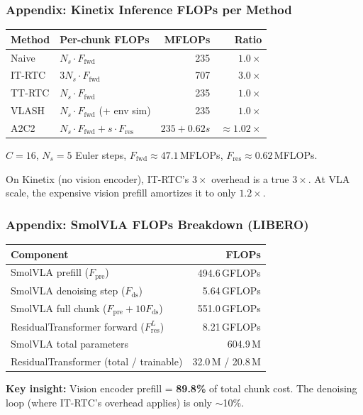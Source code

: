 \documentclass[aspectratio=1610]{beamer}
\begin{document}
\begin{frame}
\frametitle{Appendix: Kinetix Inference FLOPs per Method}

\begin{table}
\centering
\small
\begin{tabular}{l l r r}
\toprule
\textbf{Method} & \textbf{Per-chunk FLOPs} & \textbf{MFLOPs} & \textbf{Ratio} \\
\midrule
Naive     & $N_s \cdot F_{\text{fwd}}$ & 235 & $1.0\times$ \\
IT-RTC    & $3 N_s \cdot F_{\text{fwd}}$ & 707 & $3.0\times$ \\
TT-RTC    & $N_s \cdot F_{\text{fwd}}$ & 235 & $1.0\times$ \\
VLASH     & $N_s \cdot F_{\text{fwd}}$ (+ env sim) & 235 & $1.0\times$ \\
A2C2      & $N_s \cdot F_{\text{fwd}} + s \cdot F_{\text{res}}$ & $235 + 0.62s$ & $\approx 1.02\times$ \\
\bottomrule
\end{tabular}
\end{table}

\small $C{=}16$, $N_s{=}5$ Euler steps, $F_{\text{fwd}} \approx 47.1$\,MFLOPs, $F_{\text{res}} \approx 0.62$\,MFLOPs.

On Kinetix (no vision encoder), IT-RTC's $3\times$ overhead is a true $3\times$. At VLA scale, the expensive vision prefill amortizes it to only $1.2\times$.

\end{frame}

\begin{frame}
\frametitle{Appendix: SmolVLA FLOPs Breakdown (LIBERO)}

\begin{table}
\centering
\small
\begin{tabular}{l r}
\toprule
\textbf{Component} & \textbf{FLOPs} \\
\midrule
SmolVLA prefill ($F_{\text{pre}}$) & 494.6\,GFLOPs \\
SmolVLA denoising step ($F_{\text{ds}}$) & 5.64\,GFLOPs \\
SmolVLA full chunk ($F_{\text{pre}} + 10 F_{\text{ds}}$) & 551.0\,GFLOPs \\
\midrule
ResidualTransformer forward ($F_{\text{res}}^L$) & 8.21\,GFLOPs \\
\midrule
SmolVLA total parameters & 604.9\,M \\
ResidualTransformer (total / trainable) & 32.0\,M / 20.8\,M \\
\bottomrule
\end{tabular}
\end{table}

\textbf{Key insight:} Vision encoder prefill = \textbf{89.8\%} of total chunk cost. The denoising loop (where IT-RTC's overhead applies) is only $\sim$10\%.

\end{frame}
\end{document}

